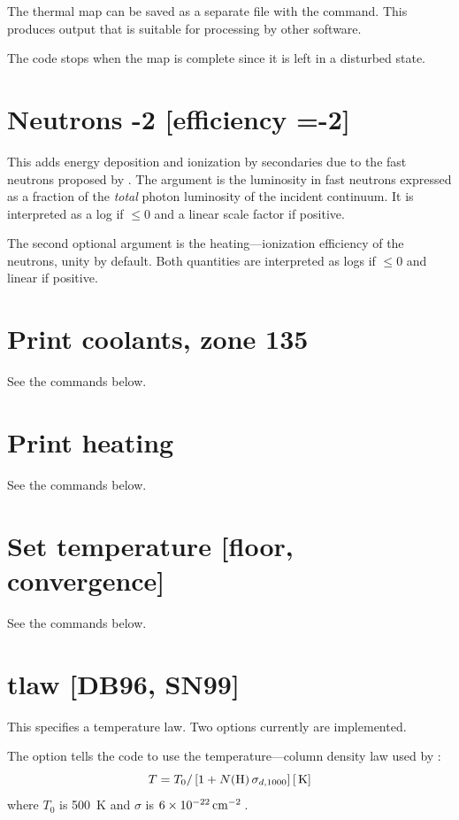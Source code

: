 The thermal map can be saved as a separate file with the
 command.
This produces output that is suitable for
processing by other software.

The code stops when the map is complete since it is left in a disturbed
state.

\section{Neutrons -2 [efficiency =-2]}

This adds energy deposition and ionization by secondaries due to the
fast neutrons proposed by \citet{Sikora1989}.
The argument
is the luminosity in fast neutrons expressed as a fraction of the
\emph{total} photon luminosity of the incident continuum.
It is interpreted as a log
if $\le 0$ and a linear scale factor if positive.

The second optional argument is the heating---ionization efficiency
of the neutrons, unity by default.
Both quantities are interpreted as logs
if $\le 0$ and linear if positive.

\section{Print coolants, zone 135}

See the  commands below.

\section{Print heating}

See the  commands below.

\section{Set temperature [floor, convergence]}

See the  commands below.

\section{tlaw [DB96, SN99]}

This specifies a temperature law.
Two options currently are implemented.

The  option tells the code to use
the temperature---column density
law used by \citet{Draine1996}:
\begin{equation}
T = T_0 /\left[ {1 + N({\mathrm{H}})\,\sigma _{d{,}1000} } \right]
 [{\rm\thinspace K} ]
\end{equation}
where $T_0$ is 500~K and $\sigma$ is $6\times 10^{-22} \mbox{${\rm\thinspace cm}^{-2}\,$}$.

